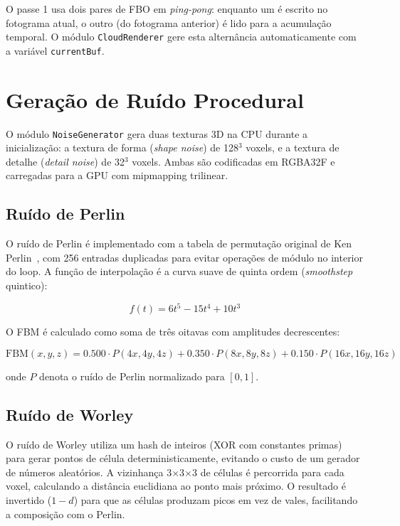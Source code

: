 O passe 1 usa dois pares de \ac{FBO} em \emph{ping-pong}: enquanto um é escrito no fotograma atual, o outro (do fotograma anterior) é lido para a acumulação temporal. O módulo \texttt{CloudRenderer} gere esta alternância automaticamente com a variável \texttt{currentBuf}.

\section{Geração de Ruído Procedural}
\label{chap4:sec:noise}

O módulo \texttt{NoiseGenerator} gera duas texturas 3D na \ac{CPU} durante a inicialização: a textura de forma (\emph{shape noise}) de 128$^3$ voxels, e a textura de detalhe (\emph{detail noise}) de 32$^3$ voxels. Ambas são codificadas em RGBA32F e carregadas para a \ac{GPU} com mipmapping trilinear.

\subsection{Ruído de Perlin}
\label{chap4:subsec:perlin}

O ruído de Perlin é implementado com a tabela de permutação original de Ken Perlin~\cite{perlin1985}, com 256 entradas duplicadas para evitar operações de módulo no interior do loop. A função de interpolação é a curva suave de quinta ordem (\emph{smoothstep} quintico):

\begin{equation}
f(t) = 6t^5 - 15t^4 + 10t^3
\label{eq:smoothstep}
\end{equation}

O \ac{FBM} é calculado como soma de três oitavas com amplitudes decrescentes:

\begin{equation}
\text{FBM}(x,y,z) = 0.500 \cdot P(4x,4y,4z) + 0.350 \cdot P(8x,8y,8z) + 0.150 \cdot P(16x,16y,16z)
\label{eq:fbm}
\end{equation}

\noindent onde $P$ denota o ruído de Perlin normalizado para $[0,1]$.

\subsection{Ruído de Worley}
\label{chap4:subsec:worley}

O ruído de Worley utiliza um hash de inteiros (XOR com constantes primas) para gerar pontos de célula deterministicamente, evitando o custo de um gerador de números aleatórios. A vizinhança 3$\times$3$\times$3 de células é percorrida para cada voxel, calculando a distância euclidiana ao ponto mais próximo. O resultado é invertido ($1 - d$) para que as células produzam picos em vez de vales, facilitando a composição com o Perlin.

